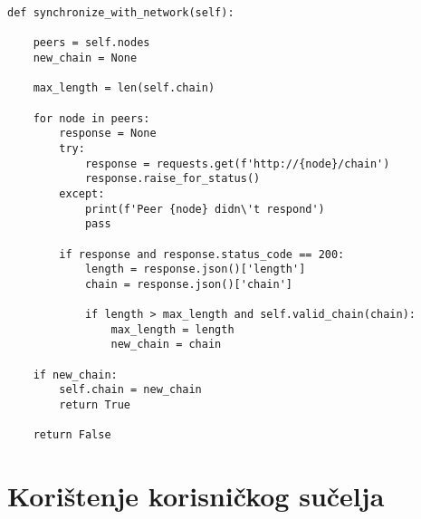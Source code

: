 \documentclass[utf8, zavrsni]{fer}
\begin{document}
\begin{verbatim}
def synchronize_with_network(self):

    peers = self.nodes
    new_chain = None

    max_length = len(self.chain)

    for node in peers:
        response = None
        try:
            response = requests.get(f'http://{node}/chain')
            response.raise_for_status()
        except:
            print(f'Peer {node} didn\'t respond')
            pass

        if response and response.status_code == 200:
            length = response.json()['length']
            chain = response.json()['chain']

            if length > max_length and self.valid_chain(chain):
                max_length = length
                new_chain = chain

    if new_chain:
        self.chain = new_chain
        return True

    return False
\end{verbatim}

\chapter{Korištenje korisničkog sučelja}




\end{document}
